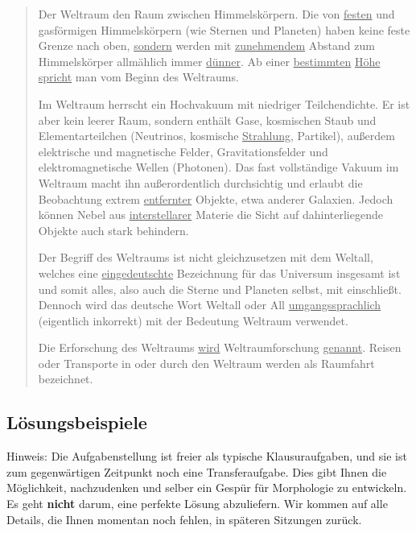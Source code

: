 \begin{quote}

  Der Weltraum  den Raum zwischen Himmelskörpern. Die  von \ul{festen} und gasförmigen Himmelskörpern (wie Sternen und Planeten) haben keine feste Grenze nach oben, \ul{sondern} werden mit \ul{zunehmendem} Abstand zum Himmelskörper allmählich immer \ul{dünner}. Ab einer \ul{bestimmten} \ul{Höhe} \ul{spricht} man vom Beginn des Weltraums.

  Im Weltraum herrscht ein Hochvakuum mit niedriger Teilchendichte. Er ist aber kein leerer Raum, sondern enthält Gase, kosmischen Staub und Elementarteilchen (Neutrinos, kosmische \ul{Strahlung}, Partikel), außerdem elektrische und magnetische Felder, Gravitationsfelder und elektromagnetische Wellen (Photonen). Das fast vollständige Vakuum im Weltraum macht ihn außerordentlich durchsichtig und erlaubt die Beobachtung extrem \ul{entfernter} Objekte, etwa anderer Galaxien. Jedoch können Nebel aus \ul{interstellarer} Materie die Sicht auf dahinterliegende Objekte auch stark behindern.

  Der Begriff des Weltraums ist nicht gleichzusetzen mit dem Weltall, welches eine \ul{eingedeutschte} Bezeichnung für das Universum insgesamt ist und somit alles, also auch die Sterne und Planeten selbst, mit einschließt. Dennoch wird das deutsche Wort Weltall oder All \ul{umgangssprachlich} (eigentlich inkorrekt) mit der Bedeutung Weltraum verwendet.

  Die Erforschung des Weltraums \ul{wird} Weltraumforschung \ul{genannt}. Reisen oder Transporte in oder durch den Weltraum werden als Raumfahrt bezeichnet.
\end{quote}

\subsection{Lösungsbeispiele}

Hinweis: Die Aufgabenstellung ist freier als typische Klausuraufgaben, und sie ist zum gegenwärtigen Zeitpunkt noch eine Transferaufgabe.
Dies gibt Ihnen die Möglichkeit, nachzudenken und selber ein Gespür für Morphologie zu entwickeln.
Es geht \textbf{nicht} darum, eine perfekte Lösung abzuliefern.
Wir kommen auf alle Details, die Ihnen momentan noch fehlen, in späteren Sitzungen zurück.

\Halbzeile

